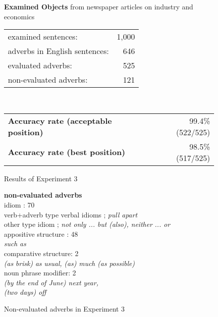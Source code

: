 \begin{singlespace}
\begin{figure}[htb]
    \leavevmode
    \small    
    {\bf Examined Objects} from newspaper articles on industry and economics\\
 \begin{tabular}{lr}
    examined sentences:                    & 1,000 \\
    adverbs in English sentences:          &   646 \\
    evaluated adverbs:        &   525 \\
    non-evaluated adverbs:    &   121 
 \end{tabular} \\
 \begin{tabular}{lr}
    {\bf Accuracy rate (acceptable position)} & 99.4\% (522/525) \\
    {\bf Accuracy rate (best position)}       & 98.5\% (517/525)
 \end{tabular}
\vspace*{1mm}
    \caption{Results of Experiment 3}
    \label{fig:result3}
\end{figure}
\end{singlespace}

\begin{singlespace}
\begin{figure}[htb]
    \leavevmode
    \small    
    {\bf non-evaluated adverbs} \\
\hspace*{1cm} idiom : 70 \\
\hspace*{2cm}   verb+adverb type verbal idioms ;  {\em pull apart} \\
\hspace*{2cm}   other type idiom ; 
                 {\em not only ... but (also), neither ... or} \\
\hspace*{1cm} appositive structure : 48 \\
\hspace*{2cm}   {\em such as} \\
\hspace*{1cm} comparative structure: 2 \\
\hspace*{2cm}   {\em (as brisk) as usual, (as) much (as possible)} \\
\hspace*{1cm} noun phrase modifier: 2 \\
\hspace*{2cm}   {\em (by the end of June) next year,} \\
\hspace*{2cm}   {\em (two days) off} 
\vspace*{1mm}
\caption{Non-evaluated adverbs in Experiment 3}
\label{fig:non-evaluated_adverb}
\end{figure}
\end{singlespace}


